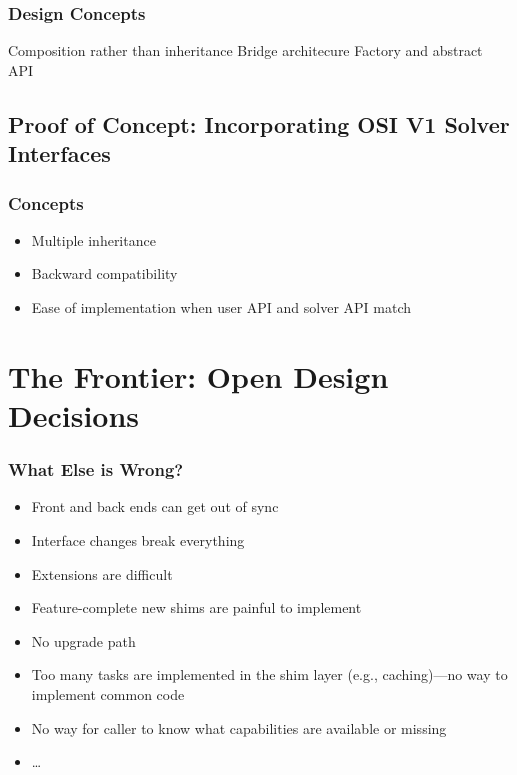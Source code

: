 \documentclass{beamer}
\begin{document}
\begin{frame}
  \frametitle{Design Concepts}

  Composition rather than inheritance
  Bridge architecure
  Factory and abstract API
\end{frame}

\subsection{Proof of Concept: Incorporating OSI V1 Solver
  Interfaces}

\begin{frame}
  \frametitle{Concepts}

  \begin{itemize}
  \item Multiple inheritance
  \item Backward compatibility
  \item Ease of implementation when user API and solver API match
  \end{itemize}

\end{frame}

\section{The Frontier: Open Design Decisions}


\begin{frame}
  \frametitle{What Else is Wrong?}

  \begin{itemize}
  \item Front and back ends can get out of sync
  \item Interface changes break everything
  \item Extensions are difficult
  \item Feature-complete new shims are painful to implement
  \item No upgrade path
  \item Too many tasks are implemented in the shim layer (e.g.,
    caching)---no way to implement common code
  \item No way for caller to know what capabilities are available or
    missing
  \item \dots
  \end{itemize}
\end{frame}
\end{document}
